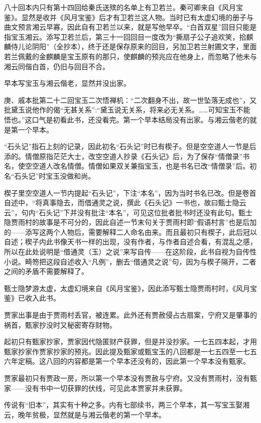\par 八十回本内只有第十四回给秦氏送殡的名单上有卫若兰。秦可卿来自《风月宝鉴》。显然是收并《风月宝鉴》后才有卫若兰这人物。当时已有太虚幻境的册子与曲文预言湘云早寡，因此自有卫若兰以来，就是写他早卒。“白首双星”回目只能是指宝玉湘云。添写卫若兰后，第三十一回回目一度改为“撕扇子公子追欢笑，拾麒麟侍儿论阴阳”（全抄本），终于还是保存原来的回目，另加卫若兰射圃文字，里面若兰佩戴的金麒麟是宝玉原有的那只，使麒麟的预兆应在他身上，而忽略了他未与湘云同偕白首，仍旧与回目不合。
\par 早本写宝玉与湘云偕老，显然并没出家。
\par 庚、戚本批第二十二回宝玉二次悟禅机：“二次翻身不出，故一世坠落无成也”，又批黛玉说他作的偈“无甚关系”:“黛玉说无关系，将来必无关系。……可知宝玉不能悟也。”这口气是初看此书，还没看完。第一个早本结局没有出家。与湘云偕老的就是第一个早本。
\par “石头记”指石上刻的记录，因此初名“石头记”时已有楔子。但是空空道人一节是后添的。情僧原指茫茫大士，改空空道人抄录《石头记》后，为了保存“情僧录”书名，使空空道人改名情僧。情僧如果双关兼指宝玉，也是书名已改“情僧录”后。初名“石头记”时宝玉没做和尚。
\par 楔子里空空道人一节内提起“石头记”，下注“本名”，因为当时书名已改。但是卷首自述中，“将真事隐去，而借通灵之说，撰此《石头记》一书也，故曰甄士隐云云”，句内“石头记”下并没有批注“本名”，可见这位批者批书时还没有此句。甄士隐贾雨村的故事是不可分的，因此自述一节末句关于贾雨村即“假语村言”也是后加的——添写这两个人物后，需要解释二人命名由来。而且最初只有楔子，此后冠以自述；楔子内此书像天书一样的出现，没有作者，与作者自述合看，有混乱之感，所以在此处说明是“借通灵（玉）之说”来写自传——在这阶段，此书自视为自传性小说。畸笏把这段自述收入“凡例”，删去“借通灵之说”句，因为与楔子隔开，二者之间的矛盾不需要解释了。
\par 甄士隐梦游太虚，太虚幻境来自《风月宝鉴》，因此添写甄士隐贾雨村时，《风月宝鉴》已收入此书。
\par 贾家出事是由于贾雨村丢官，被连累。此外还有贾赦侵占古扇案，宁府又是肇事的祸首，甄家抄没时又秘密寄存财物。
\par 起初只有甄家抄家，贾家因代隐匿财产获罪，但是并没抄家。一七五四本起，才用甄家抄家作贾家抄家的预兆。因此提及甄家或甄宝玉的八回都是一七五四至一七五六年定稿。这八回的内容都是第一个早本还没有的，因此第一个早本没有甄家。
\par 贾家最初只有贾政一房，所以第一个早本没有贾赦与宁府。又没有贾雨村，没有甄家——没有书中一切获罪的伏线，可见此本贾家并未获罪。
\par 传说有“旧本”，其实有十种之多。内有七部续书，两三个早本，其一写宝玉娶湘云，晚年贫极，显然就是与湘云偕老的第一个早本。
